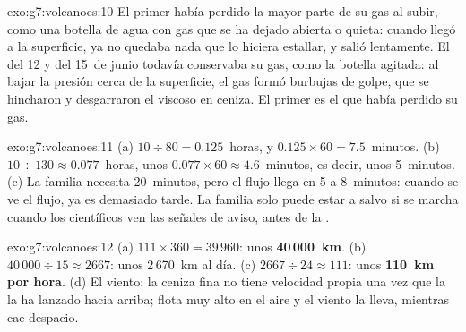 \begin{solution}{exo:g7:volcanoes:10}
El primer  había perdido la mayor parte de su gas al subir, como una
botella de agua con gas que se ha dejado abierta o quieta: cuando llegó a
la superficie, ya no quedaba nada que lo hiciera estallar, y salió
lentamente. El  del 12 y del 15~de junio todavía conservaba su gas,
como la botella agitada: al bajar la presión cerca de la superficie, el gas
formó burbujas de golpe, que se hincharon y desgarraron el  viscoso en
ceniza. El primer  es el que había perdido su gas.
\end{solution}

\begin{solution}{exo:g7:volcanoes:11}
(a) $10 \div 80 = 0.125$~horas, y $0.125 \times 60 = 7.5$~minutos. (b)
$10 \div 130 \approx 0.077$~horas, unos $0.077 \times 60 \approx
4.6$~minutos, es decir, unos 5~minutos. (c) La familia necesita
20~minutos, pero el flujo llega en 5 a 8~minutos: cuando se ve el flujo, ya
es demasiado tarde. La familia solo puede estar a salvo si se marcha cuando
los científicos ven las señales de aviso, antes de la .
\end{solution}

\begin{solution}{exo:g7:volcanoes:12}
(a) $111 \times 360 = 39\,960$: unos \textbf{40\,000~km}. (b)
$40\,000 \div 15 \approx 2667$: unos 2\,670~km al día. (c)
$2667 \div 24 \approx 111$: unos \textbf{110~km por hora}. (d) El viento:
la ceniza fina no tiene velocidad propia una vez que la  la ha
lanzado hacia arriba; flota muy alto en el aire y el viento la lleva,
mientras cae despacio.
\end{solution}

